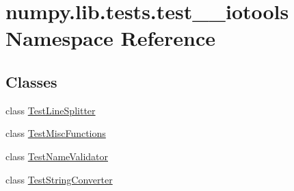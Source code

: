 \hypertarget{namespacenumpy_1_1lib_1_1tests_1_1test____iotools}{}\section{numpy.\+lib.\+tests.\+test\+\_\+\+\_\+iotools Namespace Reference}
\label{namespacenumpy_1_1lib_1_1tests_1_1test____iotools}
\subsection*{Classes}
\begin{DoxyCompactItemize}
\item 
class \hyperlink{classnumpy_1_1lib_1_1tests_1_1test____iotools_1_1TestLineSplitter}{Test\+Line\+Splitter}
\item 
class \hyperlink{classnumpy_1_1lib_1_1tests_1_1test____iotools_1_1TestMiscFunctions}{Test\+Misc\+Functions}
\item 
class \hyperlink{classnumpy_1_1lib_1_1tests_1_1test____iotools_1_1TestNameValidator}{Test\+Name\+Validator}
\item 
class \hyperlink{classnumpy_1_1lib_1_1tests_1_1test____iotools_1_1TestStringConverter}{Test\+String\+Converter}
\end{DoxyCompactItemize}
